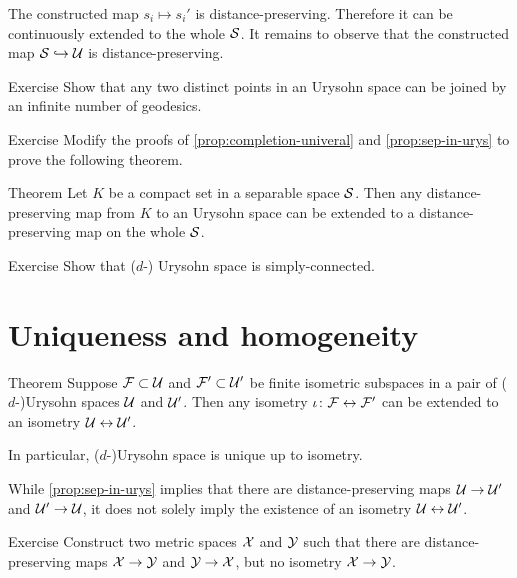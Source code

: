 The constructed map $s_i\mapsto s_i'$ is distance-preserving.
Therefore it can be continuously extended to the whole $\mathcal{S}$.
It remains to observe that the constructed map $\mathcal{S}\hookrightarrow\mathcal{U}$ is distance-preserving.
\qeds

\begin{thm}{Exercise}\label{ex:geodesics-urysohn}
Show that any two distinct points in an Urysohn space can be joined by an infinite number of geodesics.
\end{thm}

\begin{thm}{Exercise}\label{ex:compact-extension}
Modify the proofs of \ref{prop:completion-univeral} and \ref{prop:sep-in-urys} to prove the following theorem.
\end{thm}

\begin{thm}{Theorem}\label{thm:compact-extension}
Let $K$ be a compact set in a separable space $\mathcal{S}$.
Then any distance-preserving map from $K$ to an Urysohn space can be extended to 
a distance-preserving map on the whole $\mathcal{S}$.
\end{thm}

\begin{thm}{Exercise}\label{ex:sc-urysohn}
Show that ($d$-) Urysohn space is simply-connected.
\end{thm}



\section{Uniqueness and homogeneity}

\begin{thm}{Theorem}\label{thm:urysohn-unique}
Suppose $\mathcal{F}\subset \mathcal{U}$ and $\mathcal{F}'\subset \mathcal{U}'$ be finite isometric subspaces in a pair of ($d$-)Urysohn spaces $\mathcal{U}$ and $\mathcal{U}'$.
Then any isometry $\iota\colon\mathcal{F}\leftrightarrow \mathcal{F}'$ can be extended to an isometry $\mathcal{U}\leftrightarrow \mathcal{U}'$.

In particular, ($d$-)Urysohn space is unique up to isometry.
\end{thm}

While \ref{prop:sep-in-urys} implies that there are distance-preserving maps $\mathcal{U}\to \mathcal{U}'$ and $\mathcal{U}'\to \mathcal{U}$,
it does not solely imply the existence of an isometry $\mathcal{U}\leftrightarrow \mathcal{U}'$.

\begin{thm}{Exercise}\label{ex:no-isom}
Construct two metric spaces $\mathcal{X}$ and $\mathcal{Y}$ such that 
there are distance-preserving maps $\mathcal{X}\to \mathcal{Y}$ and $\mathcal{Y}\to \mathcal{X}$, but no isometry $\mathcal{X}\to \mathcal{Y}$.
\end{thm}


